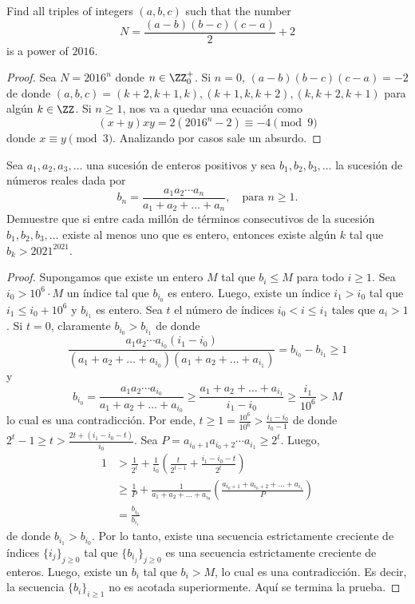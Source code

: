\begin{probEB}
	Find all triples of integers $(a,b,c)$ such that the number
	\[N=\frac{(a-b)(b-c)(c-a)}{2}+2\]
	is a power of $2016$.
\end{probEB}

\begin{proof}
	Sea $N=2016^n$ donde $n\in\ZZ^+_0$. Si $n=0$, $(a-b)(b-c)(c-a)=-2$ de donde $(a,b,c)=(k+2,k+1,k),(k+1,k,k+2),(k,k+2,k+1)$ para algún $k\in\ZZ$. Si $n\ge 1$, nos va a quedar una ecuación como
	\[(x+y)xy=2(2016^n-2)\equiv -4\pmod 9\]
	donde $x\equiv y\pmod 3$. Analizando por casos sale un absurdo.
\end{proof}

\begin{probMB}[IberoAmerican 2021/3]
	Sea $a_1,a_2,a_3,\dots$ una sucesión de enteros positivos y sea $b_1,b_2,b_3,\dots$ la sucesión de números reales dada por
	\[b_n=\frac{a_1a_2\cdots a_n}{a_1+a_2+\dots+a_n},\quad\text{para }n\ge 1.\]
	Demuestre que si entre cada millón de términos consecutivos de la sucesión $b_1,b_2,b_3,\dots$ existe al menos uno que es entero, entonces existe algún $k$ tal que $b_k>2021^{2021}$.
\end{probMB}

\begin{proof}
	Supongamos que existe un entero $M$ tal que $b_i\le M$ para todo $i\ge 1$. Sea $i_0>10^6\cdot M$ un índice tal que $b_{i_0}$ es entero. Luego, existe un índice $i_1>i_0$ tal que $i_1\le i_0+10^6$ y $b_{i_1}$ es entero. Sea $t$ el número de índices $i_0<i\le i_1$ tales que $a_i>1$. Si $t=0$, claramente $b_{i_0}>b_{i_1}$ de donde
	\[\frac{a_1a_2\cdots a_{i_0}(i_1-i_0)}{(a_1+a_2+\dots+a_{i_0})(a_1+a_2+\dots+a_{i_1})}=b_{i_0}-b_{i_1}\ge 1\]
	y
	\[b_{i_0}=\frac{a_1a_2\cdots a_{i_0}}{a_1+a_2+\dots+a_{i_0}}\ge\frac{a_1+a_2+\dots+a_{i_1}}{i_1-i_0}\ge\frac{i_1}{10^6}>M\]
	lo cual es una contradicción. Por ende, $t\ge 1=\frac{10^6}{10^6}>\frac{i_1-i_0}{i_0-1}$ de donde $2^t-1\ge t>\frac{2t+(i_1-i_0-t)}{i_0}$. Sea $P=a_{i_0+1}a_{i_0+2}\cdots a_{i_1}\ge 2^t$. Luego,
	\begin{align*}
		1
		&>\frac{1}{2^t}+\frac{1}{i_0}\left(\frac{t}{2^{t-1}}+\frac{i_1-i_0-t}{2^t}\right)\\
		&\ge\frac{1}{P}+\frac{1}{a_1+a_2+\dots+a_{i_0}}\left(\frac{a_{i_0+1}+a_{i_0+2}+\dots+a_{i_1}}{P}\right)\\
		&=\frac{b_{i_0}}{b_{i_1}}
	\end{align*}
	de donde $b_{i_1}>b_{i_0}$. Por lo tanto, existe una secuencia estrictamente creciente de índices $\{i_j\}_{j\ge 0}$ tal que $\{b_{i_j}\}_{j\ge 0}$ es una secuencia estrictamente creciente de enteros. Luego, existe un $b_i$ tal que $b_i>M$, lo cual es una contradicción. Es decir, la secuencia $\{b_i\}_{i\ge 1}$ no es acotada superiormente. Aquí se termina la prueba.
\end{proof}

